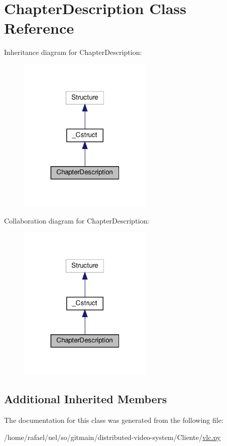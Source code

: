 \hypertarget{classvlc_1_1_chapter_description}{}\section{Chapter\+Description Class Reference}
\label{classvlc_1_1_chapter_description}


Inheritance diagram for Chapter\+Description\+:
\nopagebreak
\begin{figure}[H]
\begin{center}
\leavevmode
\includegraphics[width=181pt]{classvlc_1_1_chapter_description__inherit__graph}
\end{center}
\end{figure}


Collaboration diagram for Chapter\+Description\+:
\nopagebreak
\begin{figure}[H]
\begin{center}
\leavevmode
\includegraphics[width=181pt]{classvlc_1_1_chapter_description__coll__graph}
\end{center}
\end{figure}
\subsection*{Additional Inherited Members}


The documentation for this class was generated from the following file\+:\begin{DoxyCompactItemize}
\item 
/home/rafael/uel/so/gitmain/distributed-\/video-\/system/\+Cliente/\hyperlink{vlc_8py}{vlc.\+py}\end{DoxyCompactItemize}
